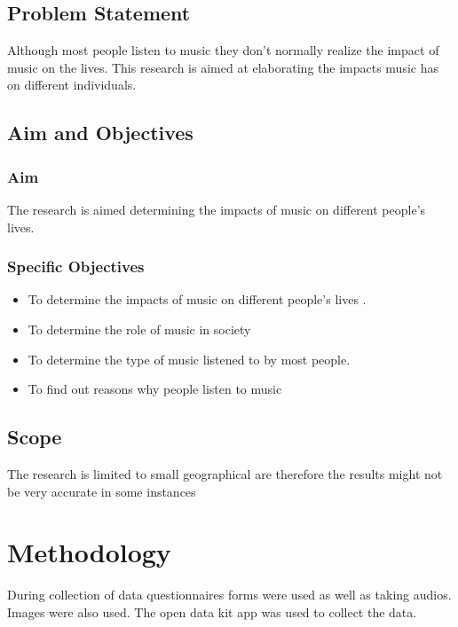 \documentclass[12pt, a4paper]{report}
\begin{document}
\subsection*{Problem Statement}
Although most people listen to music they don’t normally realize the impact of music on the lives.
This research is aimed at elaborating the impacts music has on different individuals.


\subsection*{Aim and Objectives}
\subsubsection*{Aim}
The research is aimed determining the impacts of music on different people’s lives.
\subsubsection*{Specific Objectives}
\begin{itemize}
\item To determine the impacts of music on different people’s lives .
\item To determine the role of music in society 
\item To determine the type of music listened to by most people. 
\item To find out reasons why people listen to music

\end{itemize}

\subsection*{Scope}
The research is limited to small geographical are therefore the results might not be very accurate in some instances 



\section*{Methodology}
During collection of data questionnaires forms were used as well as taking audios. Images were also used. The open data kit app was used to collect the data.
\end{document}
